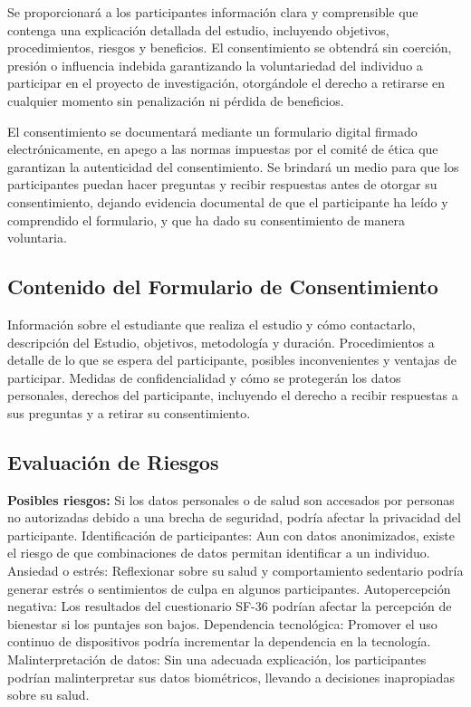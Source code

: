 Se proporcionará a los participantes información clara y comprensible que contenga una explicación detallada del estudio, incluyendo objetivos, procedimientos, riesgos y beneficios. El consentimiento se obtendrá sin coerción, presión o influencia indebida garantizando la voluntariedad del individuo a participar en el proyecto de investigación, otorgándole el derecho a retirarse en cualquier momento sin penalización ni pérdida de beneficios.

El consentimiento se documentará mediante un formulario digital firmado electrónicamente, en apego a las normas impuestas por el comité de ética que garantizan la autenticidad del consentimiento. Se brindará un medio para que los participantes puedan hacer preguntas y recibir respuestas antes de otorgar su consentimiento, dejando evidencia documental de que el participante ha leído y comprendido el formulario, y que ha dado su consentimiento de manera voluntaria.

\subsection{Contenido del Formulario de Consentimiento}
\label{subsec:contenido_formulario_consentimiento}

Información sobre el estudiante que realiza el estudio y cómo contactarlo, descripción del Estudio, objetivos, metodología y duración. Procedimientos a detalle de lo que se espera del participante, posibles inconvenientes y ventajas de participar. Medidas de confidencialidad y cómo se protegerán los datos personales, derechos del participante, incluyendo el derecho a recibir respuestas a sus preguntas y a retirar su consentimiento.

\subsection{Evaluación de Riesgos}
\label{subsec:evaluacion_riesgos}

\textbf{Posibles riesgos:} Si los datos personales o de salud son accesados por personas no autorizadas debido a una brecha de seguridad, podría afectar la privacidad del participante. Identificación de participantes: Aun con datos anonimizados, existe el riesgo de que combinaciones de datos permitan identificar a un individuo. Ansiedad o estrés: Reflexionar sobre su salud y comportamiento sedentario podría generar estrés o sentimientos de culpa en algunos participantes. Autopercepción negativa: Los resultados del cuestionario SF-36 podrían afectar la percepción de bienestar si los puntajes son bajos. Dependencia tecnológica: Promover el uso continuo de dispositivos podría incrementar la dependencia en la tecnología. Malinterpretación de datos: Sin una adecuada explicación, los participantes podrían malinterpretar sus datos biométricos, llevando a decisiones inapropiadas sobre su salud.

